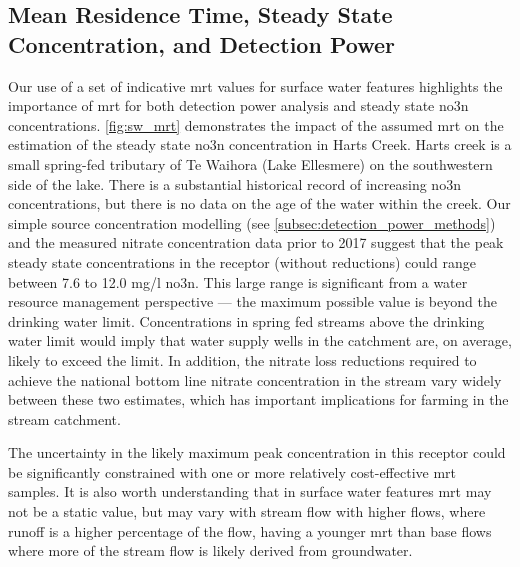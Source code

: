 \subsection[Mean Residence Time Impacts]{Mean Residence Time, Steady State Concentration, and Detection Power} \label{sec:mrt_results}

Our use of a set of indicative \gls{mrt} values for surface water features highlights the importance of \gls{mrt} for both detection power analysis and steady state \gls{no3n} concentrations.
\autoref{fig:sw_mrt} demonstrates the impact of the assumed \gls{mrt} on the estimation of the steady state \gls{no3n} concentration in Harts Creek.
Harts creek is a small spring-fed tributary of Te Waihora (Lake Ellesmere) on the southwestern side of the lake. There is a substantial historical record of increasing \gls{no3n} concentrations, but there is no data on the age of the water within the creek.
Our simple source concentration modelling (see \autoref{subsec:detection_power_methods}) and the measured nitrate concentration data prior to 2017 suggest that the peak steady state concentrations in the receptor (without reductions) could range between 7.6 to 12.0 mg/l \gls{no3n}.
This large range is significant from a water resource management perspective --- the maximum possible value is beyond the drinking water limit.
Concentrations in spring fed streams above the drinking water limit would imply that water supply wells in the catchment are, on average, likely to exceed the limit.
In addition, the nitrate loss reductions required to achieve the national bottom line nitrate concentration in the stream vary widely between these two estimates, which has important implications for farming in the stream catchment.

The uncertainty in the likely maximum peak concentration in this receptor could be significantly constrained with one or more relatively cost-effective \gls{mrt} samples.
It is also worth understanding that in surface water features \gls{mrt} may not be a static value, but may vary with stream flow with higher flows, where runoff is a higher percentage of the flow, having a younger \gls{mrt} than base flows where more of the stream flow is likely derived from groundwater.


